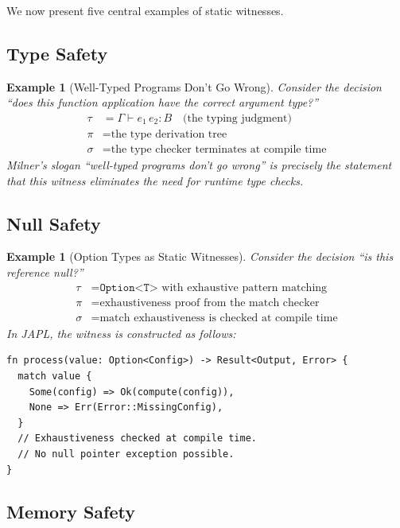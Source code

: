 \documentclass[11pt]{article}
\newtheorem{example}[theorem]{Example}
\begin{document}
We now present five central examples of static witnesses.

\subsection{Type Safety}

\begin{example}[Well-Typed Programs Don't Go Wrong]
\label{ex:type-safety}
Consider the decision ``does this function application have the correct argument type?''
\begin{align*}
  \tau &= \Gamma \vdash e_1\,e_2 : B \quad\text{(the typing judgment)} \\
  \pi &= \text{the type derivation tree} \\
  \sigma &= \text{the type checker terminates at compile time}
\end{align*}
Milner's slogan ``well-typed programs don't go wrong'' is precisely the statement that
this witness eliminates the need for runtime type checks.
\end{example}

\subsection{Null Safety}

\begin{example}[Option Types as Static Witnesses]
\label{ex:null-safety}
Consider the decision ``is this reference null?''
\begin{align*}
  \tau &= \texttt{Option<T>} \text{ with exhaustive pattern matching} \\
  \pi &= \text{exhaustiveness proof from the match checker} \\
  \sigma &= \text{match exhaustiveness is checked at compile time}
\end{align*}
In JAPL, the witness is constructed as follows:
\end{example}

\begin{lstlisting}[caption={Null safety through exhaustive matching in JAPL}]
fn process(value: Option<Config>) -> Result<Output, Error> {
  match value {
    Some(config) => Ok(compute(config)),
    None => Err(Error::MissingConfig),
  }
  // Exhaustiveness checked at compile time.
  // No null pointer exception possible.
}
\end{lstlisting}

\subsection{Memory Safety}
\end{document}
